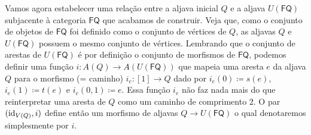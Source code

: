 Vamos agora estabelecer uma relação entre a aljava inicial $Q$ e a aljava $U(\mathsf{FQ})$ subjacente à categoria $\mathsf{FQ}$ que acabamos de construir.
Veja que, como o conjunto de objetos de $\mathsf{FQ}$ foi definido como o conjunto de vértices de $Q$, as aljavas $Q$ e $U(\mathsf{FQ})$ possuem o mesmo conjunto de vértices.
Lembrando que o conjunto de arestas de $U(\mathsf{FQ})$ é por definição o conjunto de morfismos de $\mathsf{FQ}$, podemos definir uma função $i: A(Q) \to A(U(\mathsf{FQ}))$ que mapeia uma aresta $e$ da aljava $Q$ para o morfismo (= caminho) $i_e: [1] \to Q$ dado por $i_e(0) \coloneqq s(e)$, $i_e(1) \coloneqq t(e)$ e $i_e(0,1) \coloneqq e$.
Essa função $i_e$ não faz nada mais do que reinterpretar uma aresta de $Q$ como um caminho de comprimento $2$.
O par $(\mathrm{id}_{V(Q)},i)$ define então um morfismo de aljavas $Q \to U(\mathsf{FQ})$ o qual denotaremos simplesmente por $i$.

